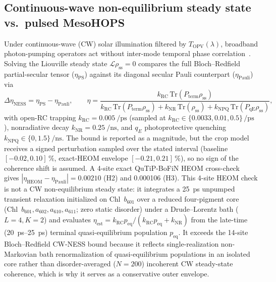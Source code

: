 \documentclass[preprint,12pt,a4paper]{elsarticle}
\begin{document}
\subsection{Continuous-wave non-equilibrium steady state vs.\ pulsed MesoHOPS}
Under continuous-wave (CW) solar illumination filtered by $T_{\mathrm{OPV}}(\lambda)$, broadband photon-pumping operators act without inter-mode temporal phase correlation~\cite{BrumerShapiro2012,Kassal2013}. Solving the Liouville steady state $\mathcal{L}\rho_{\mathrm{ss}} = 0$ compares the full Bloch--Redfield partial-secular tensor ($\eta_{\mathrm{PS}}$) against its diagonal secular Pauli counterpart ($\eta_{\mathrm{Pauli}}$) via
\begin{equation}
 \Delta\eta_{\mathrm{NESS}} = \eta_{\mathrm{PS}} - \eta_{\mathrm{Pauli}}, \qquad
 \eta = \frac{k_{\mathrm{RC}}\,\mathrm{Tr}(P_{\mathrm{term}}\rho_{\mathrm{ss}})}{k_{\mathrm{RC}}\,\mathrm{Tr}(P_{\mathrm{term}}\rho_{\mathrm{ss}}) + k_{\mathrm{NR}}\,\mathrm{Tr}(\rho_{\mathrm{ss}}) + k_{\mathrm{NPQ}}\,\mathrm{Tr}(P_{\mathrm{qE}}\rho_{\mathrm{ss}})},
 \label{eq:ness_eta}
\end{equation}
with open-RC trapping $k_{\mathrm{RC}} = \qty{0.005}{\per\pico\second}$ (sampled at $k_{\mathrm{RC}} \in \{\num{0.0033}, \num{0.01}, \num{0.5}\}\,\unit{\per\pico\second}$), nonradiative decay $k_{\mathrm{NR}} = \qty{0.25}{\per\nano\second}$, and $q_E$ photoprotective quenching $k_{\mathrm{NPQ}} \in \{\num{0}, \num{1.5}\}\,\unit{\per\nano\second}$. The bound is reported as a magnitude, but the crop model receives a signed perturbation sampled over the stated interval (baseline $[\num{-0.02},\num{+0.10}]\,\unit{\percent}$, exact-HEOM envelope $[\num{-0.21},\num{+0.21}]\,\unit{\percent}$), so no sign of the coherence shift is assumed. A 4-site exact QuTiP-BoFiN HEOM cross-check~\cite{Lambert2023} gives $|\eta_{\mathrm{HEOM}}-\eta_{\mathrm{Pauli}}| = \num{0.00210}$ (H2) and \num{0.000106} (H3). This 4-site HEOM check is not a CW non-equilibrium steady state: it integrates a \qty{25}{\pico\second} unpumped transient relaxation initialized on Chl~$b_{601}$ over a reduced four-pigment core (Chl~$b_{601}, a_{602}, a_{610}, a_{611}$; zero static disorder) under a Drude--Lorentz bath ($L=4, K=2$) and evaluates $\eta_{\mathrm{est}} = k_{\mathrm{RC}}p_{\mathrm{eq}}/(k_{\mathrm{RC}}p_{\mathrm{eq}} + k_{\mathrm{NR}})$ from the late-time (\qtyrange{20}{25}{\pico\second}) terminal quasi-equilibrium population $p_{\mathrm{eq}}$. It exceeds the 14-site Bloch--Redfield CW-NESS bound because it reflects single-realization non-Markovian bath renormalization of quasi-equilibrium populations in an isolated core rather than disorder-averaged ($N=\num{200}$) incoherent CW steady-state coherence, which is why it serves as a conservative outer envelope.
\end{document}
